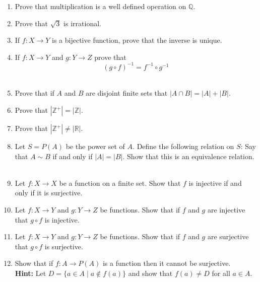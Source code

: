 \documentclass[12pt,letterpaper]{article}
\newcommand{\rr}{\mathbb R}     %
\newcommand{\zz}{\mathbb Z}    %
\theoremstyle{plain}
\theoremstyle{definition}
\begin{document}
\begin{enumerate}[1.]
\ \\ 
\item  Prove that multiplication is a well defined operation on $\mathbb{Q}$.
\ \\
\item Prove that $\sqrt{3}$ is irrational. 
\ \\
\item If $f:X\rightarrow Y$ is a bijective function, prove that the inverse is unique. 
\ \\
\item If $f:X\rightarrow Y$ and $g:Y\rightarrow Z$ prove that 
\[(g\circ f)^{-1}=f^{-1}\circ g^{-1}\]
\ \\
\item Prove that if $A$ and $B$ are disjoint finite sets that $|A\cap B|=|A|+|B|$.
\ \\
\item Prove that $|\zz^+|=|\zz|$.
\ \\
\item Prove that $|\zz^+| \neq |\rr|$.
\ \\
\item Let $S=P(A)$ be the power set of $A$. Define the following relation on $S$: Say that $A\sim B$ if and only if $|A|=|B|$. Show that this is an equivalence relation. 
\ \\
\item Let $f:X\rightarrow X$ be a function on a finite set. Show that $f$ is injective if and only if it is surjective.
\ \\
\item Let $f:X\rightarrow Y$ and $g:Y\rightarrow Z$ be functions. Show that if $f$ and $g$ are injective that $g\circ f$ is injective. 
\ \\
\item Let $f:X\rightarrow Y$ and $g:Y\rightarrow Z$ be functions. Show that if $f$ and $g$ are surjective that $g\circ f$ is surjective. 
\ \\
\item Show that if $f:A\rightarrow P(A)$ is a function then it cannot be surjective. \\
{\bf Hint:} Let $D=\{a\in A\mid a\not\in f(a)\}$ and show that $f(a)\neq D$ for all $a\in A$.
\ \\
\end{enumerate}
\end{document}
